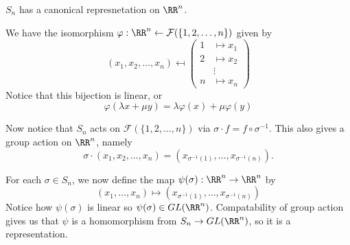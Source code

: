 \begin{ex}
$S_n$ has a canonical represnetation on $\RR^n$.

We have the isomorphism
$\varphi : \RR^n \leftarrow \mathcal{F}(\lbrace 1, 2, \dots, n\rbrace)$
given by
\[ (x_1, x_2, \dots, x_n) \mapsfrom \left(\begin{aligned}
1 &\mapsto x_1 \\
2 &\mapsto x_2 \\
&\vdots \\
n &\mapsto x_n
\end{aligned}\right) \]
Notice that this bijection is linear, or
\[ \varphi(\lambda x + \mu y) = \lambda\varphi(x) + \mu\varphi(y) \]

Now notice that $S_n$ acts on $\mathcal{F}(\lbrace 1, 2, \dots,
n\rbrace)$ via $\sigma \cdot f = f \circ \sigma^{-1}$. This also gives a
group action on $\RR^n$, namely
\[ \sigma \cdot (x_1, x_2, \dots, x_n) = (x_{\sigma^{-1}(1)}, \dots,
x_{\sigma^{-1}(n)}). \]

For each $\sigma \in S_n$, we now define the map $\psi(\sigma) : \RR^n
\to \RR^n$ by
\[ (x_1, \dots, x_n) \mapsto (x_{\sigma^{-1}(1)}, \dots,
x_{\sigma^{-1}(n)}) \]
Notice how $\psi(\sigma)$ is linear so $\psi(\sigma) \in GL(\RR^n)$.
Compatability of group action gives us that $\psi$ is a homomorphism
from $S_n \to GL(\RR^n)$, so it is a representation.
\end{ex}
